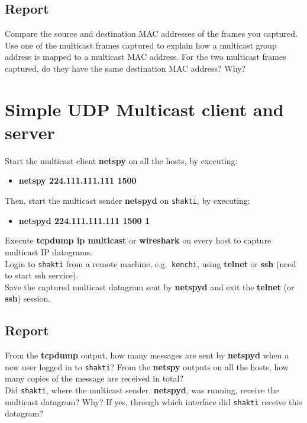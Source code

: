 \documentclass{../UTNetLab}
\begin{document}
    \subsection*{Report}
    Compare the source and destination MAC addresses of the frames you captured. \\
    Use one of the multicast frames captured to explain how a multicast group address is mapped to a multicast MAC address.
    For the two multicast frames captured, do they have the same destination MAC address?
    Why?

\section{Simple UDP Multicast client and server}
    Start the multicast client \textbf{netspy} on all the hosts, by executing:
    \begin{itemize}
        \item [] \textbf{netspy 224.111.111.111 1500}
    \end{itemize}
    Then, start the multicast sender \textbf{netspyd} on \texttt{shakti}, by executing:
    \begin{itemize}
        \item [] \textbf{netspyd 224.111.111.111 1500 1}
    \end{itemize}
    Execute \textbf{tcpdump ip multicast} or \textbf{wireshark} on every host to capture multicast IP datagrams. \\
    Login to \texttt{shakti} from a remote machine, e.g.\  \texttt{kenchi}, using \textbf{telnet} or \textbf{ssh} (need to start ssh service). \\
    Save the captured multicast datagram sent by \textbf{netspyd} and exit the \textbf{telnet} (or \textbf{ssh}) session.

    \subsection*{Report}
    From the \textbf{tcpdump} output, how many messages are sent by \textbf{netspyd} when a new user logged in to \texttt{shakti}?
    From the \textbf{netspy} outputs on all the hosts, how many copies of the message are received in total? \\
    Did \texttt{shakti}, where the multicast sender, \textbf{netspyd}, was running, receive the multicast datagram?
    Why?
    If yes, through which interface did \texttt{shakti} receive this datagram?
\end{document}
